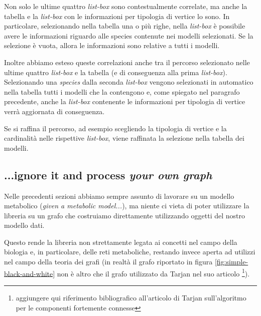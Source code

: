 Non solo le ultime quattro \emph{list-box} sono contestualmente
correlate, ma anche la tabella e la \emph{list-box} con le
informazioni per tipologia di vertice lo sono. In particolare,
selezionando nella tabella una o pi\`u righe, nella \emph{list-box}
\`e possibile avere le informazioni riguardo alle species contenute
nei modelli selezionati. Se la selezione \`e vuota, allora le
informazioni sono relative a tutti i modelli.

Inoltre abbiamo esteso queste correlazioni anche tra il percorso
selezionato nelle ultime quattro \emph{list-box} e la tabella (e di
conseguenza alla prima \emph{list-box}). Selezionando una
\emph{species} dalla seconda \emph{list-box} vengono selezionati in
automatico nella tabella tutti i modelli che la contengono e, come
spiegato nel paragrafo precedente, anche la \emph{list-box} contenente
le informazioni per tipologia di vertice verr\`a aggiornata di
conseguenza.

Se si raffina il percorso, ad esempio scegliendo la tipologia di
vertice e la cardinalit\`a nelle rispettive \emph{list-box}, viene
raffinata la selezione nella tabella dei modelli.

\subsection{...ignore it and process \emph{your own graph}}
Nelle precedenti sezioni abbiamo sempre assunto di lavorare su un
modello metabolico (\emph{given a metabolic model...}), ma niente ci
vieta di poter utilizzare la libreria su un grafo che costruiamo
direttamente utilizzando oggetti del nostro modello dati.

Questo rende la libreria non strettamente legata ai concetti nel campo
della biologia e, in particolare, delle reti metaboliche, restando
invece aperta ad utilizzi nel campo della teoria dei grafi (in
realt\`a il grafo riportato in figura \ref{fig:simple-black-and-white}
non \`e altro che il grafo utilizzato da Tarjan nel suo articolo
\footnote{aggiungere qui riferimento bibliografico all'articolo di
  Tarjan sull'algoritmo per le componenti fortemente connesse}).


